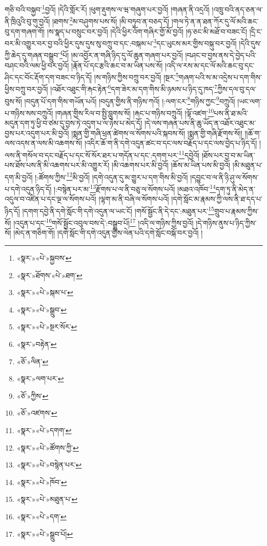 གཅི་བའི་བསྐྱབ་\footnote{«སྣར་»«པེ་»སྐྱབས་}བྱའོ། །དེའི་གློར་རོ། །ཕུག་རྡུགས་ལ་ཝ་གཞུག་པར་བྱའོ། །གཞན་ནི་འདྲའོ། །འཁྲུ་བའི་ནད་ཅན་ལ་ནི་ཁྲིའུའི་བུ་གུ་བྱའོ། །ཐགས་\footnote{«སྣར་»ཐོགས་«པེ་»ཐག་}མ་བཤུགས་པས་སོ། །མི་བཏུབ་ན་བཅད་དོ། །གལ་ཏེ་ན་ན་ཐན་ཀོར་དུ་ལོ་མའི་ཆང་བུ་དག་གཞག་གོ། །ས་སྣད་པ་བསྲུང་བར་བྱའོ། །དེའི་ཕྱིར་འོག་གཞིར་གྱོ་མོ་བྱའོ། །ཧ་ཅང་མི་མཐོ་བ་བཟང་ངོ། །དྲི་ང་བར་མི་འགྱུར་བར་བྱ་བའི་ཕྱིར་དུས་དུས་སུ་བཀྲུ་བ་དང་:བསྐམ་པ་\footnote{«སྣར་»«པེ་»སྐམ་པ་}དང་ཡུངས་མར་གྱིས་བསྐུ་བར་བྱའོ། །དེའི་དུས་ཀྱི་ཆེད་དུ་གཞན་བསྒྲུབ་\footnote{«སྣར་»«པེ་»སྒྲུབ་}པོ། །མ་འབྱོར་ན་གཞི་ཉིད་དུ་ལོ་ཆུན་གཞག་པར་བྱའོ། །བཤང་བ་བྱས་ནས་དེ་བྱེད་པའི་བཤང་བའི་ལམ་ཕྱི་བར་བྱའོ། །རྣོན་པོ་དང་རྩའི་ཆང་བ་མ་ཡིན་པས་སོ། །འདི་ལ་རས་མ་དང་ལོ་མའི་ཆང་བུ་དང་ཤིང་དང་བོང་རྡོག་དག་བཟང་བ་ཉིད་དོ། །ས་གཉིས་ཀྱིས་བཀྲུ་བར་བྱའོ། །སྔར་\footnote{«སྣར་»«པེ་»སྔར་སོར་}གཞག་པའི་ས་མ་འདྲེས་པ་དག་གིས་ཕྱིས་བཀྲུ་བར་བྱའོ། །འཐོར་འཐུང་གི་རྐང་རྟེན་\footnote{«སྣར་»བརྟེན་}དག་ཟེར་མ་དག་གིས་མི་ཉམས་པ་ཉིད་དུ་ཁད་\footnote{«ཅོ་»ལིན་}ཀྱིས་དལ་བུ་དལ་བུས་སོ། །བདུན་པོ་དག་གིས་གཡོན་པའོ། །བདུན་གྱིས་ནི་གཉིས་ཀའོ། །:ལག་ངར་\footnote{«སྣར་»ལག་པར་}གཉིས་ཀྱང་\footnote{«ཅོ་»ཀྱིས་}བཀྲུའོ། །ཡང་ལག་པ་གཉིས་སས་བཀྲུའོ། །གཞན་གྱིས་རིལ་བ་སྤྱི་བླུགས་སོ། །རྐང་པ་གཉིས་བཀྲུའོ། །ལྟོ་འཛག་\footnote{«ཅོ་»འཛགས་}པས་ནི་ཐ་མའི་མདུན་དག་ཏུ་ཕྱི་བ་ཙམ་དུ་བྱས་ཏེ་འདུག་པ་ལ་ཉེས་པ་མེད་དོ། །དེ་ལས་གཞན་པས་ནི་ཆུ་ཡོད་ན་འཐོར་འཐུང་མ་བྱས་པར་འདུག་པར་མི་བྱའོ། །སྨན་གྱི་གཞི་ཕྲན་ཚེགས་ལ་སོགས་པའི་སྐབས་སོ། །སྨན་གྱི་གཞི་རྫོགས་སོ།། །།ཆོ་ག་ལས་འདས་ན་ལས་མི་འཆགས་སོ། །འདིར་ཆོ་ག་ནི་དགེ་འདུན་ཚང་བ་དང་ལས་བརྗོད་པ་དང་ལས་བྱེད་པ་ཉིད་དོ། །ལས་ནི་གསོལ་བ་དང་བརྗོད་པ་དང་སོ་སོར་ཐར་པ་གདོན་པ་དང་:དགག་པར་\footnote{«སྣར་»«པེ་»དགག་}དབྱེའོ། །ཐོས་པར་བྱ་བ་མ་ཡིན་པས་ཐོས་པས་ནི་མི་འཆགས་པར་མི་འགྱུར་རོ། །མི་འཆགས་པར་མི་བྱའོ། །ཆོས་མ་ཡིན་པས་མི་བྱའོ། །མི་མཐུན་པ་དག་མི་བྱའོ། །:ཚོགས་ཀྱིས་\footnote{«སྣར་»«པེ་»ཚོགས་ཀྱི་}མི་བྱའོ། །དགེ་འདུན་དུ་མ་གྱུར་པ་དག་གིས་མི་བྱའོ། །དབྱུང་བ་ལ་ནི་ཉི་ཤུ་ལ་སོགས་པ་དགེ་འདུན་ཉིད་དོ། །:བསྙེན་པར་མ་\footnote{«སྣར་»«པེ་»བསྙེན་པར་}རྫོགས་པ་ལ་ནི་བཅུ་ལ་སོགས་པའོ། །མཐའ་འཁོབ་\footnote{«སྣར་»«པེ་»ཁོབ་}དག་ཏུ་ནི་མེད་ན་འདུལ་བ་འཛིན་པ་དང་ལྔ་ལ་སོགས་པའོ། །ལྷག་མ་ནི་བཞི་ལ་སོགས་པའོ། །དགེ་སློང་མ་རྣམས་ཀྱི་ལས་ནི་ཐ་དད་པ་ཉིད་དོ། །དགག་དབྱེ་ནི་དགེ་སློང་གི་དགེ་འདུན་ལ་ཡང་ངོ། །གསོ་སྦྱོང་ནི་དེ་དང་:མཐུན་པར་\footnote{«སྣར་»«པེ་»མཐུན་པ་}གྲུབ་པ་རྣམས་ཀྱིས་སོ། །འདུན་པ་དང་\footnote{«སྣར་»«པེ་»དག་}གསོ་སྦྱོང་འབུལ་བས་དེ་:བསྒྲུབ་པོ།\footnote{«སྣར་»«པེ་»སྒྲུབ་པོ།} །འདི་ལ་གཉིས་ཀྱིས་བྱའོ། །དེ་གཉིས་ནུས་པ་ཉིད་ཀྱིས་སོ། །མེད་ན་གཅིག་གོ། །དགེ་སློང་གི་དགེ་འདུན་གྱིས་ལེན་པའི་དགེ་སློང་བསྐོ་བར་བྱའོ། །
